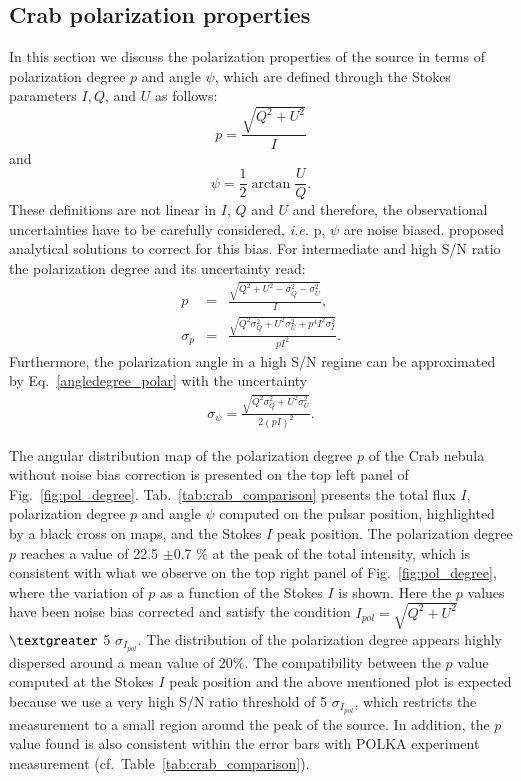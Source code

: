 \documentclass[twocolumn,traditabstract]{aa}
\begin{document}
\subsection{Crab polarization properties}\label{sec:pol_properties}
In this section we discuss the polarization properties of the source in terms of polarization degree $p$ and angle $\psi$, which are defined through the Stokes parameters $I, Q$, and $U$ as follows:
\begin{equation}
 p    = \frac{\sqrt{Q^2 + U^2}}{I} \nonumber 
\end{equation}
and
 \begin{equation}
 \psi = \frac{1}{2}\arctan\frac{U}{Q}.\label{angledegree_polar}
 \end{equation}
These definitions are not linear in $I$, $Q$ and $U$ and therefore, the observational uncertainties have to be carefully considered, {\it i.e.} p, $\psi$ are noise biased. 
\citet{1980A&A....91...97S,1985A&A...142..100S,montier} proposed analytical solutions to correct for this bias. For intermediate and high S/N ratio the polarization degree and its uncertainty read:
 \begin{eqnarray}
 p    &=& \frac{\sqrt{Q^2 + U^2 - \sigma_{Q}^2 - \sigma_{U}^2}}{I}, \nonumber \\ 
  \sigma_{p} &=& \frac{\sqrt{Q^2\sigma_Q^2 + U^2\sigma_U^2 + p^4I^2\sigma_I^2}}{pI^2}.
  \label{p_true_degree}
 \end{eqnarray}
 Furthermore, the polarization angle in a high S/N regime can be approximated by Eq.~\ref{angledegree_polar} with the uncertainty
  \begin{eqnarray}\label{angle_uncertainty}
  \sigma_{\psi} = \frac{\sqrt{Q^2\sigma_Q^2 + U^2\sigma_U^2}}{2(pI)^2}.
  \end{eqnarray}

The angular distribution map of the polarization degree $p$ of the Crab nebula
without noise bias correction is presented on the top left panel of
Fig.~\ref{fig:pol_degree}.  Tab.~\ref{tab:crab_comparison} presents the total
flux $I$, polarization degree $p$ and angle $\psi$ computed on the pulsar
position, highlighted by a black cross on maps, and the Stokes $I$ peak
position.  The polarization degree $p$ reaches a value of 22.5 $\pm$0.7 \% at
the peak of the total intensity, which is consistent with what we observe on the
top right panel of Fig.~\ref{fig:pol_degree}, where the variation of $p$ as a
function of the Stokes $I$ is shown.  Here the $p$ values have been noise bias
corrected and satisfy the condition $I_{pol}=\sqrt{Q^2+U^2}$ $\textgreater$ 5
$\sigma_{I_{pol}}$. The distribution of the polarization degree appears highly
dispersed around a mean value of 20\%.  The compatibility between the $p$ value
computed at the Stokes $I$ peak position and the above mentioned plot is
expected because we use a very high S/N ratio threshold of 5 $\sigma_{I_{pol}}$,
which restricts the measurement to a small region around the peak of the source.
In addition, the $p$ value found is also consistent within the error bars with
POLKA experiment measurement \citep{2014PASP..126.1027W} (cf.~Table~\ref{tab:crab_comparison}).
\end{document}
